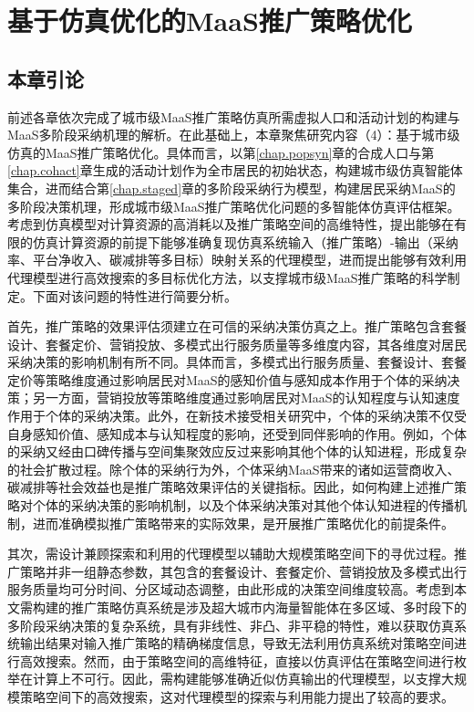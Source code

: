  \setlength{\baselineskip}{20pt}
\chapter{基于仿真优化的MaaS推广策略优化}\label{chap.optimization}

\section{本章引论}\label{sec.opt.intro}

前述各章依次完成了城市级MaaS推广策略仿真所需虚拟人口和活动计划的构建与MaaS多阶段采纳机理的解析。在此基础上，本章聚焦研究内容（4）：基于城市级仿真的MaaS推广策略优化。具体而言，以第\ref{chap.popsyn}章的合成人口与第\ref{chap.cohact}章生成的活动计划作为全市居民的初始状态，构建城市级仿真智能体集合，进而结合第\ref{chap.staged}章的多阶段采纳行为模型，构建居民采纳MaaS的多阶段决策机理，形成城市级MaaS推广策略优化问题的多智能体仿真评估框架。考虑到仿真模型对计算资源的高消耗以及推广策略空间的高维特性，提出能够在有限的仿真计算资源的前提下能够准确复现仿真系统输入（推广策略）-输出（采纳率、平台净收入、碳减排等多目标）映射关系的代理模型，进而提出能够有效利用代理模型进行高效搜索的多目标优化方法，以支撑城市级MaaS推广策略的科学制定。下面对该问题的特性进行简要分析。

首先，推广策略的效果评估须建立在可信的采纳决策仿真之上。推广策略包含套餐设计、套餐定价、营销投放、多模式出行服务质量等多维度内容，其各维度对居民采纳决策的影响机制有所不同。具体而言，多模式出行服务质量、套餐设计、套餐定价等策略维度通过影响居民对MaaS的感知价值与感知成本作用于个体的采纳决策；另一方面，营销投放等策略维度通过影响居民对MaaS的认知程度与认知速度作用于个体的采纳决策。此外，在新技术接受相关研究中，个体的采纳决策不仅受自身感知价值、感知成本与认知程度的影响，还受到同伴影响的作用。例如，个体的采纳又经由口碑传播与空间集聚效应反过来影响其他个体的认知进程，形成复杂的社会扩散过程。除个体的采纳行为外，个体采纳MaaS带来的诸如运营商收入、碳减排等社会效益也是推广策略效果评估的关键指标。因此，如何构建上述推广策略对个体的采纳决策的影响机制，以及个体采纳决策对其他个体认知进程的传播机制，进而准确模拟推广策略带来的实际效果，是开展推广策略优化的前提条件。

其次，需设计兼顾探索和利用的代理模型以辅助大规模策略空间下的寻优过程。推广策略并非一组静态参数，其包含的套餐设计、套餐定价、营销投放及多模式出行服务质量均可分时间、分区域动态调整，由此形成的决策空间维度较高。考虑到本文需构建的推广策略仿真系统是涉及超大城市内海量智能体在多区域、多时段下的多阶段采纳决策的复杂系统，具有非线性、非凸、非平稳的特性，难以获取仿真系统输出结果对输入推广策略的精确梯度信息，导致无法利用仿真系统对策略空间进行高效搜索。然而，由于策略空间的高维特征，直接以仿真评估在策略空间进行枚举在计算上不可行。因此，需构建能够准确近似仿真输出的代理模型，以支撑大规模策略空间下的高效搜索，这对代理模型的探索与利用能力提出了较高的要求。

